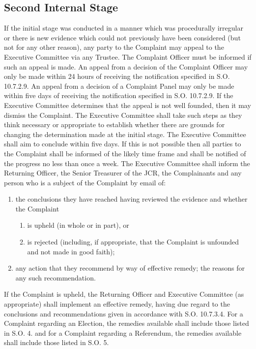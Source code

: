 \subsection{Second Internal Stage}
\npara If the initial stage was conducted in a manner which was procedurally irregular or there is new evidence which could not previously have been considered (but not for any other reason), any party to the Complaint may appeal to the Executive Committee via any Trustee.  The Complaint Officer must be informed if such an appeal is made.
\npara An appeal from a decision of the Complaint Officer may only be made within 24 hours of receiving the notification specified in S.O. 10.7.2.9.  An appeal from a decision of a Complaint Panel may only be made within five days of receiving the notification specified in S.O. 10.7.2.9.  If the Executive Committee determines that the appeal is not well founded, then it may dismiss the Complaint. 
\npara The Executive Committee shall take such steps as they think necessary or appropriate to establish whether there are grounds for changing the determination made at the initial stage.  The Executive Committee shall aim to conclude within five days.  If this is not possible then all parties to the Complaint shall be informed of the likely time frame and shall be notified of the progress no less than once a week.
\npara The Executive Committee shall inform the Returning Officer, the Senior Treasurer of the JCR, the Complainants and any person who is a subject of the Complaint by email of:
\begin{enumerate}
\item the conclusions they have reached having reviewed the evidence and whether the Complaint
\begin{enumerate}
\item is upheld (in whole or in part), or
\item is rejected (including, if appropriate, that the Complaint is unfounded and not made in good faith);
\end{enumerate}
\item any action that they recommend by way of effective remedy;
the reasons for any such recommendation.
\end{enumerate}
\npara If the Complaint is upheld, the Returning Officer and Executive Committee (as appropriate) shall implement an effective remedy, having due regard to the conclusions and recommendations given in accordance with S.O. 10.7.3.4.  For a Complaint regarding an Election, the remedies available shall include those listed in S.O. 4. and for a Complaint regarding a Referendum, the remedies available shall include those listed in S.O. 5.
